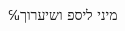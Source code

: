 \documentclass[12pt,reqno]{book}
\numberwithin{equation}{section}
\begin{document}
%


%

℆מיני ליספ ושיערוך
\begin{multicols}{2}
\minitoc
\end{multicols}

\end{document}
